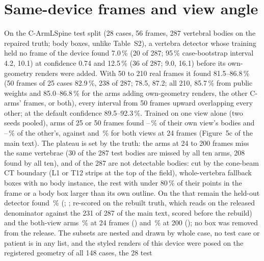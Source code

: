 \section*{Same-device frames and view angle}
On the C-ArmLSpine test split (28 cases, 56 frames, 287 vertebral bodies on the repaired truth; body boxes, unlike
Table~S2), a vertebra detector whose training held no frame of the device found 7.0\,\% (20 of 287; 95\,\%
case-bootstrap interval 4.2, 10.1) at confidence 0.74 and 12.5\,\% (36 of 287; 9.0, 16.1) before its own-geometry
renders were added. With 50 to 210 real frames it found 81.5--86.8\,\% (50 frames of 25 cases 82.9\,\%, 238 of 287;
78.5, 87.2; all 210, 85.7\,\% from public weights and 85.0--86.8\,\% for the arms adding own-geometry renders, the
other C-arms' frames, or both), every interval from 50 frames upward overlapping every other; at the default
confidence 89.5--92.3\,\%. Trained on one view alone (two seeds pooled), arms of 25 or 50 frames found
--\,\% of their own view's bodies and
--\,\% of the other's, against
 and \,\% for both views at 24 frames (Figure~5c of the main
text). The plateau is set by the truth: the arms at 24 to 200 frames miss the same vertebrae (30 of the 287 test
bodies are missed by all ten arms, 208 found by all ten), and  of the 287 are not detectable
bodies:  cut by the cone-beam CT boundary (L1 or T12 strips at the top of the field),
 whole-vertebra fallback boxes with no body instance, the rest with under 80\,\% of their
points in the frame or a body box larger than its own outline. On the  that remain the
held-out detector found \,\% (;
; re-scored on the rebuilt truth, which reads 
on the released denominator against the 231 of 287 of the main text, scored before the rebuild) and the both-view arms
\,\% at 24 frames () and
\,\% at 200 (); no box was removed from
the release. The subsets are nested and drawn by whole case, no test case or patient is in any list, and the styled renders of this device were posed on the registered geometry of all 148 cases, the 28 test
